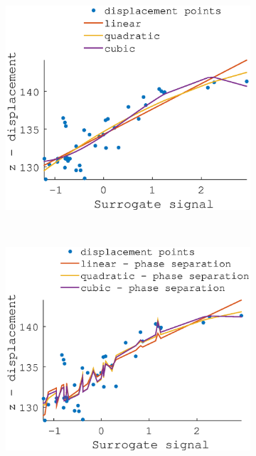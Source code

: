 \documentclass[11pt,a4paper,oneside]{report}
\begin{document}
\begin{figure}[H]
  \hspace*{-2em}
  \begin{subfigure}[b]{0.33\textwidth}
    \includegraphics[width=\textwidth, trim=0 0 0 110,clip=true]{figures/task2/fit_round1_couch2.eps}
  \end{subfigure}%
    ~ %
  \begin{subfigure}[b]{0.33\textwidth}
    \includegraphics[width=\textwidth, trim=0 0 0 110,clip=true]{figures/task2/fit_round2_couch2.eps}

\end{subfigure}
\end{figure}
\end{document}
